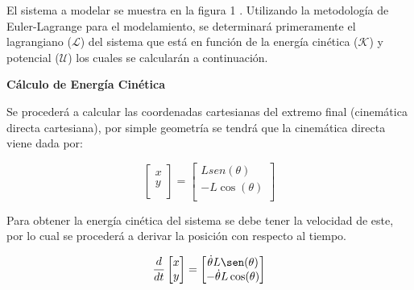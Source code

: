 \documentclass[12pt]{article}
\begin{document}
El sistema a modelar se muestra en la figura 1 \cite{taskin2017fuzzy}. Utilizando la metodología de Euler-Lagrange para el modelamiento,  se determinará primeramente el lagrangiano ($\mathcal{L}$) del sistema que está en función de la energía cinética ($\mathcal{K}$)   y potencial ($\mathcal{U}$) los cuales se calcularán a continuación.

\textbf{Cálculo de Energía Cinética}

Se procederá a calcular las coordenadas cartesianas del extremo final  (cinemática directa cartesiana), por simple geometría se tendrá que la cinemática directa viene dada por:


\begin{equation}
    \begin{bmatrix}  x \\ y \\
    \end{bmatrix}=
    \begin{bmatrix} Lsen(\theta) \\ -L\cos(\theta)  \\
    \end{bmatrix}
    \label{eq:cin_direc}
\end{equation}

Para obtener la energía cinética del sistema se debe tener la velocidad de este, por lo cual se procederá a derivar la posición con respecto al tiempo.

\begin{equation}
    \frac{d}{dt}\begin{bmatrix}
        x \\
        y \\
    \end{bmatrix}=
    \begin{bmatrix}
        \dot{\theta}L\sen(\theta)  \\
        -\dot{\theta}L\cos(\theta)  \\
    \end{bmatrix}
    \label{eq:speed}
\end{equation}
\end{document}
